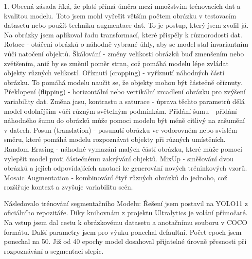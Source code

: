 1.	Obecná zásada říká, že platí přímá úměra mezi množstvím trénovacích dat a kvalitou modelu.
Toto jsem mohl vyřešit větším počtem obrázku v testovacím datasetu nebo použít techniku augmentace dat.
To je postup, který jsem zvolil já. Na obrázky jsem aplikoval řadu transformací, které přispěly k různorodosti dat.\newline
\newline
Rotace - otáčení obrázků o náhodně vybrané úhly, aby se model stal invariantním vůči natočení objektů.\newline
Škálování - změny velikosti obrázků buď zmenšením nebo zvětšením, aniž by se změnil poměr stran, což pomáhá modelu lépe zvládat objekty různých velikostí.\newline
Oříznutí (cropping) - vyříznutí náhodných částí obrázku. \newline
To pomáhá modelu naučit se, že objekty mohou být částečně oříznuty.\newline
Překlopení (flipping) - horizontální nebo vertikální zrcadlení obrázku pro zvýšení variability dat.\newline
Změna jasu, kontrastu a saturace - úprava těchto parametrů dělá model odolnějším vůči různým světelným podmínkám.\newline
Přidání šumu - přidání náhodného šumu do obrázků může pomoci modelu být méně citlivý na zašumění v datech.\newline
Posun (translation) - posunutí obrázku ve vodorovném nebo svislém směru, které pomáhá modelu rozpoznávat objekty při různých umístěních.\newline
Random Erasing - náhodné vymazání malých částí obrázku, které může pomoci vylepšit model proti částečnému zakrývání objektů.\newline
MixUp - směšování dvou obrázků a jejich odpovídajících anotací ke generování nových tréninkových vzorů.\newline
Mosaic Augmentation - kombinování čtyř různých obrázků do jednoho, což rozšiřuje kontext a zvyšuje variabilitu scén.\newline
\newline

Následovalo trénování segmentačního Modelu:
Řešení jsem postavil na YOLO11 z oficiálního repozitáře.
Díky knihovnám z projektu Ultralytics je volání přímočaré.
Na vstup jsem dal cestu k obrázkovému datasetu a anotačnímu souboru v COCO formátu.
Další parametry jsem pro výuku ponechal defaultní.
Počet epoch jsem ponechal na 50.
Již od 40 epochy model dosahoval přijatelné úrovně přesnosti při rozpoznávání a segmentaci slepic.

